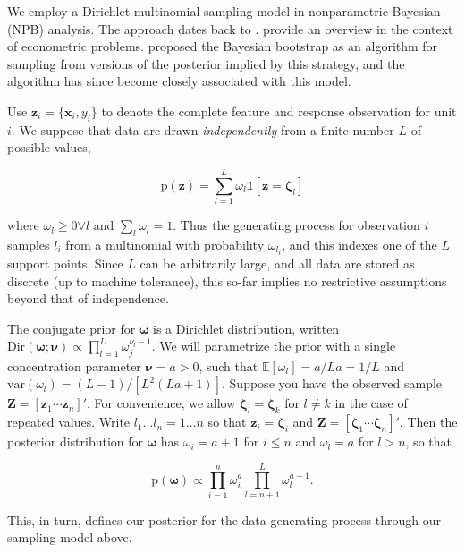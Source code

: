 \documentclass[12pt]{article}
\begin{document}
We employ a Dirichlet-multinomial sampling model in nonparametric
Bayesian (NPB) analysis. The approach dates back to
\cite{ferguson_bayesian_1973}. \cite{chamberlain_nonparametric_2003}
provide an overview in the context of econometric problems.
\cite{rubin_bayesian_1981} proposed the Bayesian bootstrap as an
algorithm for sampling from versions of the posterior implied by this
strategy, and the algorithm has since become closely associated with
this model.

Use $\mathbf{z}_i = \{\mathbf{x}_i,y_i\}$ to denote the complete feature
and response observation for unit $i$. We suppose that data are drawn
\emph{independently} from a finite number $L$ of possible values,

\begin{equation}
\mathrm{p}(\mathbf{z}) = \sum_{l=1}^L \omega_l \mathbb{1}{[\mathbf{z} = \boldsymbol{\zeta}_l]}
\end{equation}

where $\omega_l\geq0\forall l$ and $\sum_l \omega_l = 1$. Thus the
generating process for observation $i$ samples $l_i$ from a multinomial
with probability $\omega_{l_i}$, and this indexes one of the $L$ support
points. Since $L$ can be arbitrarily large, and all data are stored as
discrete (up to machine tolerance), this so-far implies no restrictive
assumptions beyond that of independence.

The conjugate prior for $\boldsymbol{\omega}$ is a Dirichlet
distribution, written
$\mathrm{Dir}(\boldsymbol{\omega}; \boldsymbol{\nu}) \propto \prod_{l=1}^L\omega_j^{\nu_l-1}$.
We will parametrize the prior with a single concentration parameter
$\boldsymbol{\nu} = a >0$, such that $\mathbb{E}[\omega_l] = a/La = 1/L$
and $\mathrm{var}(\omega_l) = (L-1)/[L^2(La+1)]$. Suppose you have the
observed sample $\mathbf{Z} = [\mathbf{z}_1 \cdots \mathbf{z}_n]'$. For
convenience, we allow $\boldsymbol{\zeta}_l=\boldsymbol{\zeta}_k$ for
$l \neq k$ in the case of repeated values. Write
$l_1 \dots l_n = 1 \dots n$ so that
$\mathbf{z}_i = \boldsymbol{\zeta}_i$ and
$\mathbf{Z} = [\boldsymbol{\zeta}_1 \cdots \boldsymbol{\zeta}_n]'$. Then
the posterior distribution for $\boldsymbol{\omega}$ has
$\omega_i = a+1$ for $i\leq n$ and $\omega_l = a$ for $l>n$, so that

\begin{equation}
\mathrm{p}(\boldsymbol{\omega} ) \propto \prod_{i=1}^n \omega_i^{a} \prod_{l=n+1}^L \omega_l^{a-1}.
\end{equation}

This, in turn, defines our posterior for the data generating process
through our sampling model above.
\end{document}
